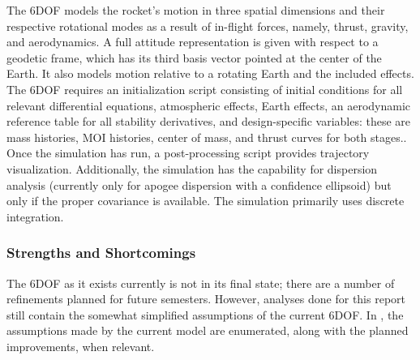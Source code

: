 The 6DOF models the rocket’s motion in three spatial dimensions and their respective rotational modes as a result of in-flight forces, namely, thrust, gravity, and aerodynamics. A full attitude representation is given with respect to a geodetic frame, which has its third basis vector pointed at the center of the Earth. It also models motion relative to a rotating Earth and the included effects. The 6DOF requires an initialization script consisting of initial conditions for all relevant differential equations, atmospheric effects, Earth effects, an aerodynamic reference table for all stability derivatives, and design-specific variables: these are mass histories, MOI histories, center of mass, and thrust curves for both stages.. Once the simulation has run, a post-processing script provides trajectory visualization. Additionally, the simulation has the capability for dispersion analysis (currently only for apogee dispersion with a confidence ellipsoid) but only if the proper covariance is available. The simulation primarily uses discrete integration.


\subsubsection{Strengths and Shortcomings}
The 6DOF as it exists currently is not in its final state; there are a number of refinements planned for future semesters. However, analyses done for this report still contain the somewhat simplified assumptions of the current 6DOF. In , the assumptions made by the current model are enumerated, along with the planned improvements, when relevant.

